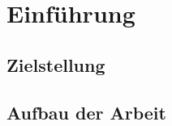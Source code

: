 \chapter{Einführung}
\label{ch:Einfuehrung}



\section{Zielstellung}
\label{sec:Zielstellung}




\section{Aufbau der Arbeit}
\label{sec:Aufbau der Arbeit}






